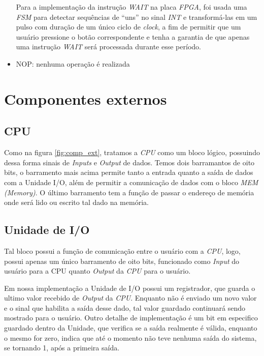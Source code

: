 \documentclass[a4paper,12pt]{report}
\begin{document}
\begin{itemize}
	Para a implementação da instrução \textit{WAIT} na placa \textit{FPGA}, foi usada uma \textit{FSM} para detectar
	sequências de ``uns'' no sinal \textit{INT} e transformá-las em um pulso com duração de um único ciclo
	de \textit{clock}, a fim de permitir que um usuário pressione o botão correspondente e tenha a garantia de que 
	apenas uma instrução \textit{WAIT} será processada durante esse período.

	\item NOP: nenhuma operação é realizada	
\end{itemize}

\section*{Componentes externos}

\subsection*{CPU}

Como na figura \ref{fig:comp_ext}, tratamos a \textit{CPU} como um bloco lógico, possuindo dessa
forma sinais de \textit{Inputs} e \textit{Output} de dados.  Temos dois barramantos de oito 
bits, o barramento mais acima permite tanto a entrada quanto a saída de dados com a Unidade I/O, 
além de permitir a comunicação de dados com o bloco \textit{MEM (Memory)}. O último
barramento tem a função de passar o endereço de memória onde será lido ou escrito tal dado na memória.

\subsection*{Unidade de I/O}
Tal bloco possui a função de comunicação entre o usuário com a \textit{CPU}, logo, possui
apenas um único barramento de oito bits, funcionado como \textit{Input} do usuário para a CPU
quanto \textit{Output} da \textit{CPU} para o usuário. 

Em nossa implementação a Unidade de I/O possui um registrador, que guarda o ultimo valor 
recebido de \textit{Output} da \textit{CPU}. Enquanto não é enviado um novo valor e o sinal que 
habilita a saída desse dado, tal valor guardado continuará sendo mostrado para o usuário. Outro
detalhe de implementação é um bit em especifico guardado dentro da Unidade, que verifica se a saída 
realmente é válida, enquanto o mesmo for zero, indica que até o momento não teve nenhuma saída do sistema,
 se tornando 1, após a primeira saída.
\end{document}

